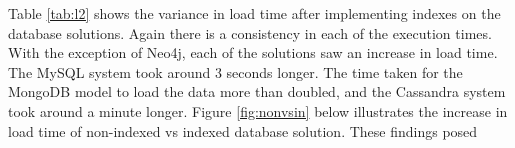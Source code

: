 \begin{table}[H]
\centering
{}
\caption{Load times for indexed database systems}
\label{tab:l2}
\end{table}
Table \ref{tab:l2} shows the variance in load time after implementing indexes on the database solutions. Again there is a consistency in each of the execution times. With the exception of Neo4j, each of the solutions saw an increase in load time. The MySQL system took around 3 seconds longer. The time taken for the MongoDB model to load the data more than doubled, and the Cassandra system took around a minute longer. Figure \ref{fig:nonvsin} below illustrates the increase in load time of non-indexed vs indexed database solution. These findings posed

